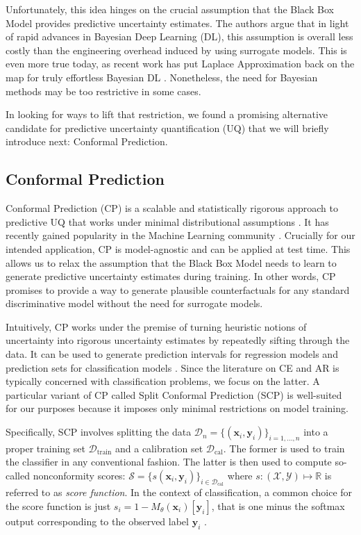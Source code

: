 \documentclass{article}
\begin{document}
Unfortunately, this idea hinges on the crucial assumption that the Black Box Model provides predictive uncertainty estimates. The authors argue that in light of rapid advances in Bayesian Deep Learning (DL), this assumption is overall less costly than the engineering overhead induced by using surrogate models. This is even more true today, as recent work has put Laplace Approximation back on the map for truly effortless Bayesian DL \citep{immer2020improving,daxberger2021laplace,antoran2023sampling}. Nonetheless, the need for Bayesian methods may be too restrictive in some cases. 

In looking for ways to lift that restriction, we found a promising alternative candidate for predictive uncertainty quantification (UQ) that we will briefly introduce next: Conformal Prediction. 

\subsection{Conformal Prediction}

Conformal Prediction (CP) is a scalable and statistically rigorous approach to predictive UQ that works under minimal distributional assumptions \citep{angelopoulos2021gentle}. It has recently gained popularity in the Machine Learning community \citep{angelopoulos2021gentle,manokhin2022awesome}. Crucially for our intended application, CP is model-agnostic and can be applied at test time. This allows us to relax the assumption that the Black Box Model needs to learn to generate predictive uncertainty estimates during training. In other words, CP promises to provide a way to generate plausible counterfactuals for any standard discriminative model without the need for surrogate models. 

Intuitively, CP works under the premise of turning heuristic notions of uncertainty into rigorous uncertainty estimates by repeatedly sifting through the data. It can be used to generate prediction intervals for regression models and prediction sets for classification models \citep{altmeyer2022conformal}. Since the literature on CE and AR is typically concerned with classification problems, we focus on the latter. A particular variant of CP called Split Conformal Prediction (SCP) is well-suited for our purposes because it imposes only minimal restrictions on model training. 

Specifically, SCP involves splitting the data $\mathcal{D}_n=\{(\mathbf{x}_i,\mathbf{y}_i)\}_{i=1,...,n}$ into a proper training set $\mathcal{D}_{\text{train}}$ and a calibration set $\mathcal{D}_{\text{cal}}$. The former is used to train the classifier in any conventional fashion. The latter is then used to compute so-called nonconformity scores: $\mathcal{S}=\{s(\mathbf{x}_i,\mathbf{y}_i)\}_{i \in \mathcal{D}_{\text{cal}}}$ where $s: (\mathcal{X},\mathcal{Y}) \mapsto \mathbb{R}$ is referred to as \textit{score function}. In the context of classification, a common choice for the score function is just $s_i=1-M_{\theta}(\mathbf{x}_i)[\mathbf{y}_i]$, that is one minus the softmax output corresponding to the observed label $\mathbf{y}_i$ \citep{angelopoulos2021gentle}. 
\end{document}

